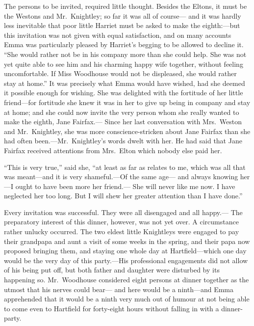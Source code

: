 The persons to be invited, required little thought.  Besides the Eltons,
it must be the Westons and Mr.\ Knightley; so far it was all of course---%
and it was hardly less inevitable that poor little Harriet must
be asked to make the eighth:---but this invitation was not given
with equal satisfaction, and on many accounts Emma was particularly
pleased by Harriet's begging to be allowed to decline it.
``She would rather not be in his company more than she could help.
She was not yet quite able to see him and his charming happy
wife together, without feeling uncomfortable.  If Miss Woodhouse
would not be displeased, she would rather stay at home.''
It was precisely what Emma would have wished, had she deemed it
possible enough for wishing.  She was delighted with the fortitude
of her little friend---for fortitude she knew it was in her to give
up being in company and stay at home; and she could now invite the
very person whom she really wanted to make the eighth, Jane Fairfax.---%
Since her last conversation with Mrs.\ Weston and Mr.\ Knightley,
she was more conscience-stricken about Jane Fairfax than she had
often been.---Mr.\ Knightley's words dwelt with her.  He had said
that Jane Fairfax received attentions from Mrs.\ Elton which nobody
else paid her.

``This is very true,'' said she, ``at least as far as relates to me,
which was all that was meant---and it is very shameful.---Of the same age---%
and always knowing her---I ought to have been more her friend.---%
She will never like me now.  I have neglected her too long.  But I
will shew her greater attention than I have done.''

Every invitation was successful.  They were all disengaged and all happy.---%
The preparatory interest of this dinner, however, was not yet over.
A circumstance rather unlucky occurred.  The two eldest little
Knightleys were engaged to pay their grandpapa and aunt a visit of
some weeks in the spring, and their papa now proposed bringing them,
and staying one whole day at Hartfield---which one day would be
the very day of this party.---His professional engagements did
not allow of his being put off, but both father and daughter were
disturbed by its happening so.  Mr.\ Woodhouse considered eight
persons at dinner together as the utmost that his nerves could bear---%
and here would be a ninth---and Emma apprehended that it would
be a ninth very much out of humour at not being able to come even
to Hartfield for forty-eight hours without falling in with a dinner-party.

